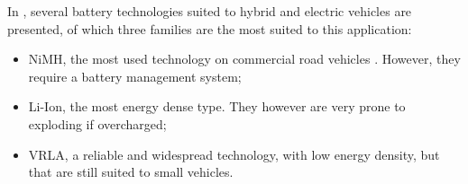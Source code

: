 \documentclass[journal]{IEEEtran}
\begin{document}



In \cite{Yiu_baterias}, several battery technologies suited to hybrid and electric vehicles are presented, of which three families are the most suited to this application:
\begin{itemize}
    \item \ac{NiMH}, the most used technology on commercial road vehicles \cite{Yiu_baterias}. However, they require a battery management system;
    \item \ac{Li-Ion}, the most energy dense type. They however are very prone to exploding if overcharged;
    \item \ac{VRLA}, a reliable and widespread technology, with low energy density, but that are still suited to small vehicles.
    \end{itemize}
\end{document}
